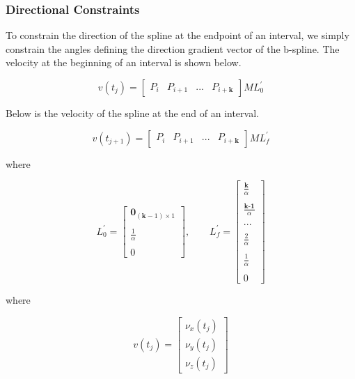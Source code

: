\documentclass{article}
\begin{document}
\subsubsection{Directional Constraints}

To constrain the direction of the spline at the endpoint of an interval, we simply constrain the angles defining the direction gradient vector of the b-spline. The velocity at the beginning of an interval is shown below.

\begin{equation}
    v(t_{j}) = \begin{bmatrix} P_{i} & P_{i+1} & ... & P_{i+\textbf{k}}\end{bmatrix} M L_0^{'}
\end{equation}

Below is the velocity of the spline at the end of an interval.

\begin{equation}
    v(t_{j+1}) = \begin{bmatrix} P_{i} & P_{i+1} & ... & P_{i+\textbf{k}}\end{bmatrix} M L_f^{'}
\end{equation}

where 

\begin{equation}
    L_0^{'} = \begin{bmatrix} \textbf{0}_{(\textbf{k}-1) \times 1} \\ \\ \frac{1}{\alpha} \\ \\ 0 \end{bmatrix} , \qquad L_f^{'} = \begin{bmatrix}
    \frac{\textbf{k}}{ \alpha} \\ \\ 
    \frac{\textbf{k-1}}{ \alpha} \\ \\ 
    ... \\ \\ 
    \frac{2}{\alpha} \\ \\ 
    \frac{1}{\alpha} \\ \\ 
    0\end{bmatrix}
\end{equation}

where

\begin{equation}
    v(t_j) = \begin{bmatrix} \nu_x(t_j) \\ \nu_y(t_j) \\ \nu_z(t_j) \end{bmatrix}
\end{equation}
\end{document}
